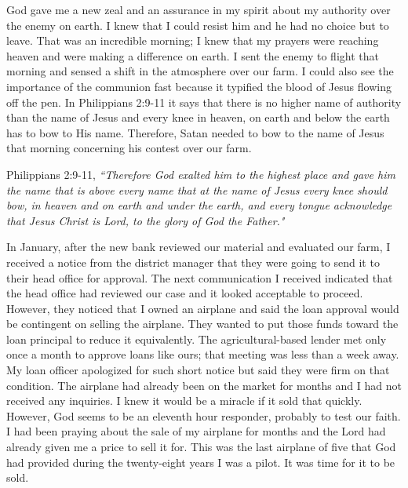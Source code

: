 \documentclass[oneside]{book}
\begin{document}
God gave me a new zeal and an assurance in my spirit about my authority over the enemy on earth. I knew that I could resist him and he had no choice but to leave. That was an incredible morning; I knew that my prayers were reaching heaven and were making a difference on earth. I sent the enemy to flight that morning and sensed a shift in the atmosphere over our farm. I could also see the importance of the communion fast because it typified the blood of Jesus flowing off the pen. In Philippians 2:9-11 it says that there is no higher name of authority than the name of Jesus and every knee in heaven, on earth and below the earth has to bow to His name. Therefore, Satan needed to bow to the name of Jesus that morning concerning his contest over our farm. 

Philippians 2:9-11, \textit{``Therefore God exalted him to the highest place and gave him the name that is above every name that at the name of Jesus every knee should bow, in heaven and on earth and under the earth, and every tongue acknowledge that Jesus Christ is Lord, to the glory of God the Father."}

In January, after the new bank reviewed our material and evaluated our farm, I received a notice from the district manager that they were going to send it to their head office for approval. The next communication I received indicated that the head office had reviewed our case and it looked acceptable to proceed. However, they noticed that I owned an airplane and said the loan approval would be contingent on selling the airplane. They wanted to put those funds toward the loan principal to reduce it equivalently. The agricultural-based lender met only once a month to approve loans like ours; that meeting was less than a week away. My loan officer apologized for such short notice but said they were firm on that condition. The airplane had already been on the market for months and I had not received any inquiries. I knew it would be a miracle if it sold that quickly. However, God seems to be an eleventh hour responder, probably to test our faith. I had been praying about the sale of my airplane for months and the Lord had already given me a price to sell it for. This was the last airplane of five that God had provided during the twenty-eight years I was a pilot. It was time for it to be sold.
\end{document}
